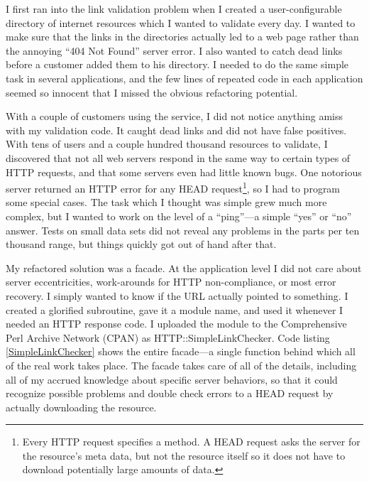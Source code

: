I first ran into the link validation problem when I created a
user-configurable directory of internet resources which I wanted to
validate every day. I wanted to make sure that the links in the
directories actually led to a web page rather than the annoying ``404
Not Found'' server error.  I also wanted to catch dead links before a
customer added them to his directory.  I needed to do the same simple
task in several applications, and the few lines of repeated code in each
application seemed so innocent that I missed the obvious refactoring
potential.

With a couple of customers using the service, I did not notice
anything amiss with my validation code.  It caught dead links and did
not have false positives. With tens of users and a couple hundred
thousand resources to validate, I discovered that not all web servers
respond in the same way to certain types of HTTP requests, and that
some servers even had little known bugs.  One notorious server
returned an HTTP error for any HEAD request\footnote{ Every HTTP
request specifies a method.  A HEAD request asks the server for the
resource's meta data, but not the resource itself so it does not have
to download potentially large amounts of data.}, so I had to program
some special cases.  The task which I thought was simple grew much
more complex, but I wanted to work on the level of a ``ping''---a
simple ``yes'' or ``no'' answer. Tests on small data sets did not
reveal any problems in the parts per ten thousand range, but things
quickly got out of hand after that.

My refactored solution was a facade.  At the application level I did
not care about server eccentricities, work-arounds for HTTP
non-compliance, or most error recovery.  I simply wanted to know
if the URL actually pointed to something. 
I created a glorified subroutine, gave it a module name, and used it
whenever I needed an HTTP response code. I uploaded the module to the
Comprehensive Perl Archive Network (CPAN)
as HTTP::SimpleLinkChecker.  Code listing \ref{SimpleLinkChecker}
shows the entire facade---a single function behind which all of the
real work takes place.  The facade takes care of all of the details,
including all of my accrued knowledge about specific server behaviors,
so that it could recognize possible problems and double check
errors to a HEAD request by actually downloading the resource.

